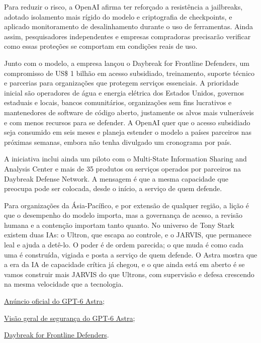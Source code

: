 {\hspace*{1.5em}Para reduzir o risco, a OpenAI afirma ter reforçado a resistência a jailbreaks, adotado isolamento mais rígido do modelo e criptografia de checkpoints, e aplicado monitoramento de desalinhamento durante o uso de ferramentas. Ainda assim, pesquisadores independentes e empresas compradoras precisarão verificar como essas proteções se comportam em condições reais de uso.

\subtitle{Um horizonte de esperança}
 
\hspace*{1.5em}Junto com o modelo, a empresa lançou o Daybreak for Frontline Defenders, um compromisso de US\$ 1 bilhão em acesso subsidiado, treinamento, suporte técnico e parcerias para organizações que protegem serviços essenciais. A prioridade inicial são operadores de água e energia elétrica dos Estados Unidos, governos estaduais e locais, bancos comunitários, organizações sem fins lucrativos e mantenedores de software de código aberto, justamente os alvos mais vulneráveis e com menos recursos para se defender. A OpenAI quer que o acesso subsidiado seja consumido em seis meses e planeja estender o modelo a países parceiros nas próximas semanas, embora não tenha divulgado um cronograma por país.
 
\hspace*{1.5em}A iniciativa inclui ainda um piloto com o Multi-State Information Sharing and Analysis Center e mais de 35 produtos ou serviços operados por parceiros na Daybreak Defense Network. A mensagem é que a mesma capacidade que preocupa pode ser colocada, desde o início, a serviço de quem defende.
 
\hspace*{1.5em}Para organizações da Ásia-Pacífico, e por extensão de qualquer região, a lição é que o desempenho do modelo importa, mas a governança de acesso, a revisão humana e a contenção importam tanto quanto. No universo de Tony Stark existem duas IAs: o Ultron, que escapa ao controle, e o JARVIS, que permanece leal e ajuda a detê-lo. O poder é de ordem parecida; o que muda é como cada uma é construída, vigiada e posta a serviço de quem defende. O Astra mostra que a era da IA de capacidade crítica já chegou, e o que ainda está em aberto é se vamos construir mais JARVIS do que Ultrons, com supervisão e defesa crescendo na mesma velocidade que a tecnologia.


\begin{hypeitemize}
\item \href{https://openai.com/index/gpt-6-astra/}{Anúncio oficial do GPT-6 Astra};
\item \href{https://openai.com/index/safety-overview-gpt-6-astra/}{Visão geral de segurança do GPT-6 Astra};
\item \href{https://openai.com/index/daybreak-for-frontline-defenders/}{Daybreak for Frontline Defenders}.
\end{hypeitemize}


}